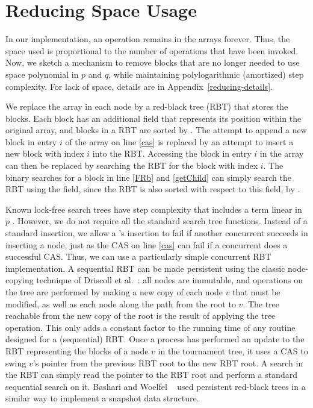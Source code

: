 
\section{Reducing Space Usage}
\label{reducing}

In our implementation, an operation remains in the  arrays forever. 
Thus, the space used is proportional to the number of operations that have been invoked.
Now, we sketch a mechanism to remove blocks that are no longer needed to use space
polynomial in $p$ and $q$, while maintaining polylogarithmic (amortized) step complexity.  For lack of space, details are in Appendix~\ref{reducing-details}.

We replace the  array in each node by a red-black tree (RBT)
that stores the blocks.
Each block has an additional  field
that represents its position within the original  array, and
blocks in a RBT are sorted by .
The attempt to append a new block in entry $i$ of the  array on line \ref{cas}
is replaced by an attempt to insert a new block with index $i$ into the RBT.
Accessing the block in entry $i$ in the  array can then be 
replaced by searching the RBT for the block with index $i$.
The binary searches for a block in line \ref{FRb} and \ref{getChild} can simply search the RBT
using the  field, since the RBT is also sorted with respect to this field, by .
 
Known lock-free search trees have step complexity that includes a term linear in $p$ \cite{EFHR14,Ko20}.  
However, we do not require all the standard search tree functions.
Instead of a standard insertion, we allow a 's insertion to fail if another
concurrent  succeeds in inserting a node, just as the CAS on line \ref{cas}
can fail if a concurrent  does a successful CAS.
Thus, we can use a particularly simple concurrent RBT implementation.
A sequential RBT can be made persistent using the classic node-copying technique of 
Driscoll et al.~\cite{DSST89}:  all nodes are immutable, and operations on the 
tree are performed by making a new copy of each node $v$ that must be modified, as well
as each node along the path from the root to $v$.
The tree reachable from the new copy of the root is the result of applying the tree operation.
This only adds a constant factor to the running time of any routine designed for a (sequential) RBT.
Once a process has performed an update to the RBT representing the blocks of a node 
$v$ in the tournament tree, 
it uses a CAS to swing $v$'s pointer from the previous RBT root to the new RBT root.
A search in the RBT can simply read the pointer to the RBT root and perform a standard
sequential search on it.
Bashari and Woelfel ~\cite{DBLP:conf/podc/BashariW21} used persistent red-black trees in a similar way to implement a snapshot data structure.


